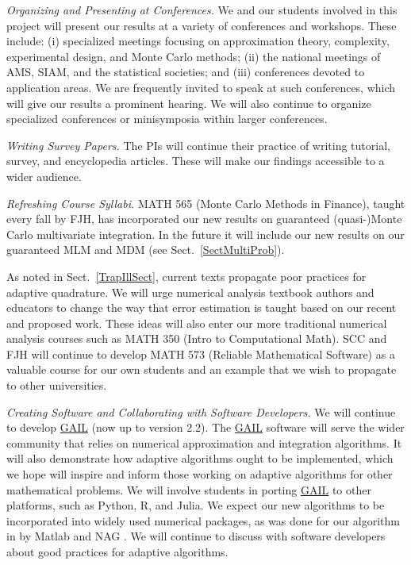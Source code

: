 \documentclass[11pt]{NSFamsart}
\newcommand{\GAIL}{\hyperlink{GAILlink}{GAIL}\xspace}
\newcommand{\Matlab}{{\sc Matlab}\xspace}
\begin{document}
\emph{Organizing and Presenting at Conferences.}
We and our students involved in this project will present our results at a variety of conferences and 
workshops.  These include: (i) specialized meetings focusing on approximation theory, complexity, 
experimental design, and Monte Carlo methods; (ii) the national meetings of AMS, SIAM, and the 
statistical societies; and (iii) conferences devoted to application areas.  We are frequently invited to 
speak at such conferences, which will give our results a prominent hearing. We will also continue to 
organize specialized conferences or minisymposia within larger conferences.

\emph{Writing Survey Papers.}
The PIs will continue their practice of writing tutorial, survey, and encyclopedia articles.  These will 
make our findings accessible to a wider audience.

\emph{Refreshing Course Syllabi.}
MATH 565 (Monte Carlo Methods in Finance), taught every fall by FJH, has incorporated our new 
results on guaranteed (quasi-)Monte Carlo multivariate integration. In the future it will include our 
new results on our guaranteed MLM and MDM (see Sect.\ \ref{SectMultiProb}).

As noted in Sect.\ \ref{TrapIllSect}, current texts propagate poor practices for 
adaptive quadrature.  We will urge numerical analysis textbook authors and educators to change the 
way that error estimation is taught based on our recent and proposed work.  These ideas will also 
enter our more traditional numerical analysis courses such as MATH 350 (Intro to Computational 
Math).  SCC and FJH will continue to develop MATH 573 (Reliable Mathematical Software) as a 
valuable course for our own students and an example that we wish to propagate to other 
universities.

\emph{Creating Software and Collaborating with Software Developers.}
We will continue to develop \GAIL \citep{ChoEtal17b} (now up to version 2.2).  The \GAIL software 
will 
serve the wider community that relies on numerical approximation and integration algorithms.  It will 
also demonstrate how adaptive algorithms ought to be implemented, which we hope will inspire and 
inform those working on adaptive algorithms for other mathematical problems.  We will involve 
students in porting \GAIL to other platforms, such as Python, R, and Julia.  We expect our 
new algorithms to be incorporated into widely used numerical packages, as was done for our 
algorithm in \cite{HonHic00a} by \Matlab \citep{MAT9.5} and NAG \citep{NAG23}.  We will continue 
to discuss with software developers about good practices for adaptive algorithms.
\end{document}
